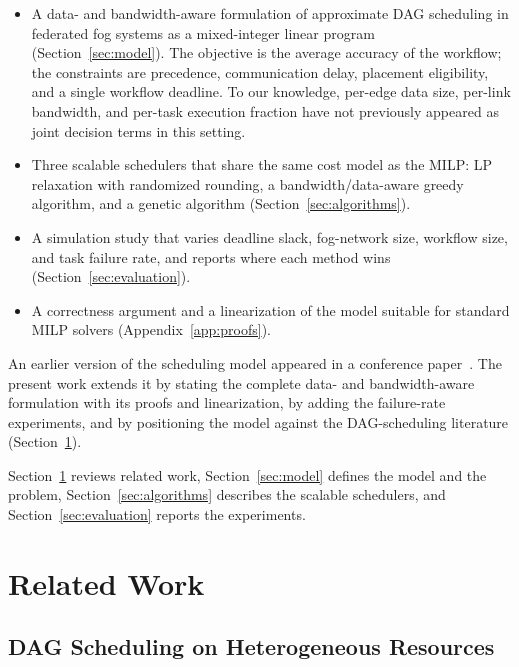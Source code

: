 \documentclass[conference]{IEEEtran}
\begin{document}
\begin{itemize}
    \item A data- and bandwidth-aware formulation of approximate DAG scheduling in federated fog systems as a mixed-integer linear program (Section~\ref{sec:model}). The objective is the average accuracy of the workflow; the constraints are precedence, communication delay, placement eligibility, and a single workflow deadline. To our knowledge, per-edge data size, per-link bandwidth, and per-task execution fraction have not previously appeared as joint decision terms in this setting.
    \item Three scalable schedulers that share the same cost model as the MILP: LP relaxation with randomized rounding, a bandwidth/data-aware greedy algorithm, and a genetic algorithm (Section~\ref{sec:algorithms}).
    \item A simulation study that varies deadline slack, fog-network size, workflow size, and task failure rate, and reports where each method wins (Section~\ref{sec:evaluation}).
    \item A correctness argument and a linearization of the model suitable for standard MILP solvers (Appendix~\ref{app:proofs}).
\end{itemize}

An earlier version of the scheduling model appeared in a conference paper~\cite{gupta2025efficient}. The present work extends it by stating the complete data- and bandwidth-aware formulation with its proofs and linearization, by adding the failure-rate experiments, and by positioning the model against the DAG-scheduling literature (Section~\ref{sec:related}).

Section~\ref{sec:related} reviews related work, Section~\ref{sec:model} defines the model and the problem, Section~\ref{sec:algorithms} describes the scalable schedulers, and Section~\ref{sec:evaluation} reports the experiments.

\section{Related Work}
\label{sec:related}

\subsection{DAG Scheduling on Heterogeneous Resources}
\end{document}
